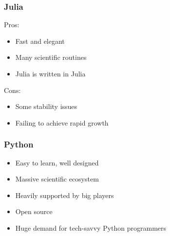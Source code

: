 \begin{frame}
    \frametitle{Julia}

    Pros:
    
    \begin{itemize}
        \item Fast and elegant
            \vspace{0.5em}
        \item Many scientific routines
            \vspace{0.5em}
        \item Julia is written in Julia
    \end{itemize}

            \vspace{0.5em}
            \vspace{0.5em}
            \vspace{0.5em}
    Cons:
    
    \begin{itemize}
        \item Some stability issues
            \vspace{0.5em}
        \item Failing to achieve rapid growth
    \end{itemize}

\end{frame}




\begin{frame}
    \frametitle{Python}
    
    \begin{itemize}
        \item Easy to learn, well designed
            \vspace{0.5em}
        \item Massive scientific ecosystem
            \vspace{0.5em}
        \item Heavily supported by big players
            \vspace{0.5em}
        \item Open source
            \vspace{0.5em}
        \item Huge demand for tech-savvy Python programmers
    \end{itemize}

\end{frame}




